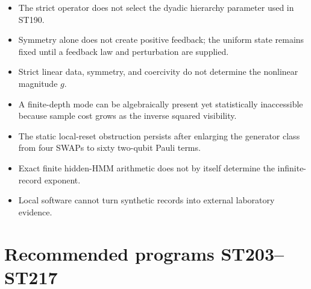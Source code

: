 \documentclass[11pt,a4paper]{article}
\begin{document}
\begin{itemize}
\item The strict operator does not select the dyadic hierarchy parameter used in ST190.
\item Symmetry alone does not create positive feedback; the uniform state remains fixed until a feedback law and perturbation are supplied.
\item Strict linear data, symmetry, and coercivity do not determine the nonlinear magnitude $g$.
\item A finite-depth mode can be algebraically present yet statistically inaccessible because sample cost grows as the inverse squared visibility.
\item The static local-reset obstruction persists after enlarging the generator class from four SWAPs to sixty two-qubit Pauli terms.
\item Exact finite hidden-HMM arithmetic does not by itself determine the infinite-record exponent.
\item Local software cannot turn synthetic records into external laboratory evidence.
\end{itemize}

\section{Recommended programs ST203--ST217}
\end{document}
